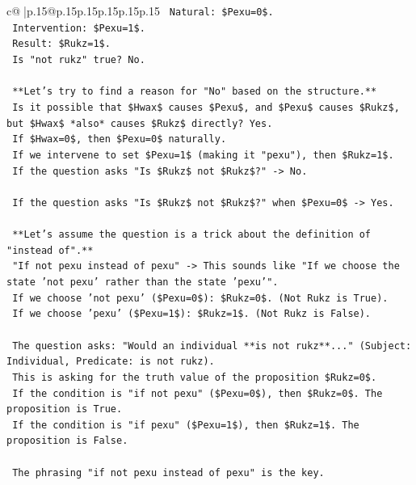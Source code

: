 \documentclass{article}
\begin{document}
{\begin{supertabular}{c@{$\;$}|p{.15\linewidth}@{}p{.15\linewidth}p{.15\linewidth}p{.15\linewidth}p{.15\linewidth}p{.15\linewidth}}
{{{\texttt{        Natural: \$Pexu=0\$.} \\
\texttt{        Intervention: \$Pexu=1\$.} \\
\texttt{        Result: \$Rukz=1\$.} \\
\texttt{        Is "not rukz" true? No.} \\
\\ 
\texttt{        **Let's try to find a reason for "No" based on the structure.**} \\
\texttt{        Is it possible that \$Hwax\$ causes \$Pexu\$, and \$Pexu\$ causes \$Rukz\$, but \$Hwax\$ *also* causes \$Rukz\$ directly? Yes.} \\
\texttt{        If \$Hwax=0\$, then \$Pexu=0\$ naturally.} \\
\texttt{        If we intervene to set \$Pexu=1\$ (making it "pexu"), then \$Rukz=1\$.} \\
\texttt{        If the question asks "Is \$Rukz\$ not \$Rukz\$?" {-}> No.} \\
\\ 
\texttt{        If the question asks "Is \$Rukz\$ not \$Rukz\$?" when \$Pexu=0\$ {-}> Yes.} \\
\\ 
\texttt{        **Let's assume the question is a trick about the definition of "instead of".**} \\
\texttt{        "If not pexu instead of pexu" {-}> This sounds like "If we choose the state 'not pexu' rather than the state 'pexu'".} \\
\texttt{        If we choose 'not pexu' (\$Pexu=0\$): \$Rukz=0\$. (Not Rukz is True).} \\
\texttt{        If we choose 'pexu' (\$Pexu=1\$): \$Rukz=1\$. (Not Rukz is False).} \\
\\ 
\texttt{        The question asks: "Would an individual **is not rukz**..." (Subject: Individual, Predicate: is not rukz).} \\
\texttt{        This is asking for the truth value of the proposition \$Rukz=0\$.} \\
\texttt{        If the condition is "if not pexu" (\$Pexu=0\$), then \$Rukz=0\$. The proposition is True.} \\
\texttt{        If the condition is "if pexu" (\$Pexu=1\$), then \$Rukz=1\$. The proposition is False.} \\
\\ 
\texttt{        The phrasing "if not pexu instead of pexu" is the key.} \\
}}}
\end{supertabular}}
\end{document}
